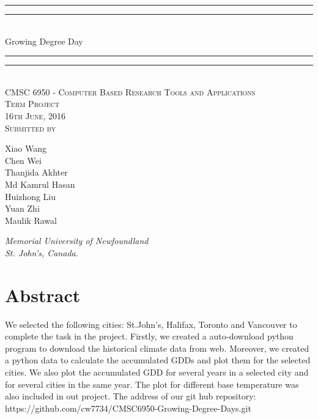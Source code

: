\documentclass[12pt]{article}
\begin{document}
{\centering

\rule{\textwidth}{1.6pt}\vspace*{-\baselineskip}\vspace*{2pt} 
\rule{\textwidth}{0.4pt}\\[\baselineskip] 
{\LARGE Growing Degree Day}
\rule{\textwidth}{0.4pt}\vspace*{-\baselineskip}\vspace{3.2pt}
\rule{\textwidth}{1.6pt}\\[\baselineskip] 

\vspace{20mm} %
\scshape %
CMSC 6950 - Computer Based Research Tools and Applications \\ [\baselineskip]
Term Project \\[\baselineskip] 
16th June, 2016 \\[\baselineskip] 
\vspace{20mm} %
Submitted by \\[\baselineskip]
{\Large Xiao Wang\\Chen Wei \\Thanjida Akhter \\ Md Kamrul Hasan \\ Huizhong Liu \\ Yuan Zhi\\Maulik Rawal \par}
\vfill
{\itshape Memorial University of Newfoundland \\ St. John's, Canada.\par} 
}

\newpage

{\centering
  \section*{Abstract}
}

We selected the following cities: St.John's, Halifax, Toronto and Vancouver to complete the task in the project. Firstly, we created a auto-download python program to download the historical climate data from web. Moreover, we created a python data to calculate the accumulated GDDs and plot them for the selected cities. We also plot the accumulated GDD for several years in a selected city and for several cities in the same year. The plot for different base temperature was also included in out project. The address of our git hub repository: https://github.com/cw7734/CMSC6950-Growing-Degree-Days.git \\
\end{document}
